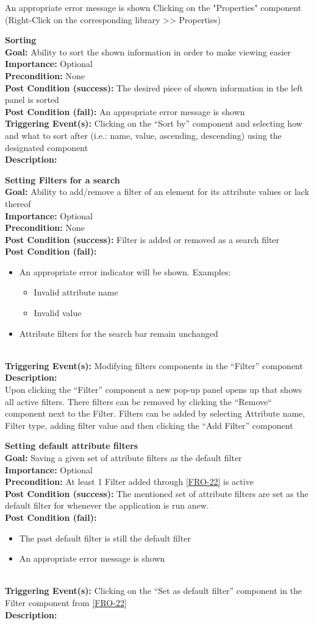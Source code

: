 \documentclass[10pt,a4paper]{report}
\newcommand{\FRDescription}[8]{
    \textbf{#1} \leavevmode \\
    \textbf{Goal: } #2 \leavevmode \\
    \textbf{Importance: } #3 \leavevmode \\
    \textbf{Precondition: } #4 \leavevmode \\
    \textbf{Post Condition (success): } #5 \leavevmode \\
    \textbf{Post Condition (fail): } #6 \leavevmode \\
    \textbf{Triggering Event(s): } #7 \leavevmode \\
    \textbf{Description: } \leavevmode \\ 
    #8}
\newcommand{\FRODescription}[8]{
    \textbf{#1} \leavevmode \\
    \textbf{Goal: } #2 \leavevmode \\
    \textbf{Importance: } #3 \leavevmode \\
    \textbf{Precondition: } #4 \leavevmode \\
    \textbf{Post Condition (success): } #5 \leavevmode \\
    \textbf{Post Condition (fail): } #6 \leavevmode \\
    \textbf{Triggering Event(s): } #7 \leavevmode \\
    \textbf{Description: } \leavevmode \\
    #8}
\begin{document}
\begin{FRO}
    {An appropriate error message is shown}
    {Clicking on the "Properties" component (Right-Click on the corresponding library  >> Properties)}
    \item \FRODescription{Sorting}
    {Ability to sort the shown information in order to make viewing easier}
    {Optional}
    {None}
    {The desired piece of shown information in the left panel is sorted}
    {An appropriate error message is shown}
    {Clicking on the “Sort by” component and selecting how and what to sort after (i.e.: name, value, ascending, descending) using the designated component}
    \item \FRDescription{Setting Filters for a search}
    {Ability to add/remove a filter of an element for its attribute values or lack thereof}
    {Optional}
    {None}
    {Filter is added or removed as a search filter}
    {\begin{itemize}
        \item An appropriate error indicator will be shown. Examples:
        \begin{itemize}
            \item Invalid attribute name
            \item Invalid value
        \end{itemize}
        \item Attribute filters for the search bar remain unchanged
    \end{itemize}}
    {Modifying filters components in the “Filter” component}
    {Upon clicking the “Filter” component a new pop-up panel opens up that shows all active filters. There filters can be removed by clicking the “Remove“ component next to the Filter. Filters can be added by selecting Attribute name, Filter type, adding filter value and then clicking the “Add Filter” component}
    \item \FRODescription{Setting default attribute filters}
    {Saving a given set of attribute filters as the default filter}
    {Optional}
    {At least 1 Filter added through \ref{FRO-22} is active}
    {The mentioned set of attribute filters are set as the default filter for whenever the application is run anew.}
    {\begin{itemize}
        \item The past default filter is still the default filter
        \item An appropriate error message is shown
    \end{itemize}}
    {Clicking on the “Set as default filter” component in the Filter component from \ref{FRO-22}}
\end{FRO}
\end{document}
